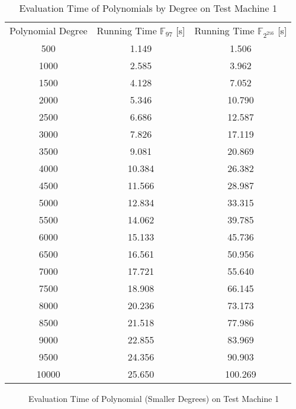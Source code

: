 \begin{table}[ht]
  \centering
  \begin{tabular}{|c|c|c|}
    Polynomial Degree & Running Time $\mathbb{F}_{97}$ [s] & Running Time
    $\mathbb{F}_{2^{256}}$ [s]\\
    500 &  1.149  &   1.506 \\
    1000 &  2.585 &   3.962 \\
    1500 &  4.128 &   7.052 \\
    2000 &  5.346 &  10.790 \\
    2500 &  6.686 &  12.587 \\
    3000 &  7.826 &  17.119 \\
    3500 &  9.081 &  20.869 \\
    4000 & 10.384 &  26.382 \\
    4500 & 11.566 &  28.987 \\
    5000 & 12.834 &  33.315 \\
    5500 & 14.062 &  39.785 \\
    6000 & 15.133 &  45.736 \\
    6500 & 16.561 &  50.956 \\
    7000 & 17.721 &  55.640 \\
    7500 & 18.908 &  66.145 \\
    8000 & 20.236 &  73.173 \\
    8500 & 21.518 &  77.986 \\
    9000 & 22.855 &  83.969 \\
    9500 & 24.356 &  90.903 \\
    10000 & 25.650 & 100.269 \\
  \end{tabular}
  \caption{Evaluation Time of Polynomials by Degree on Test Machine 1}
  \label{tab:poly-deg-t}
\end{table}

\begin{figure}[ht]
  \centering
  
  \caption{Evaluation Time of Polynomial (Smaller Degrees) on Test Machine 1}
  \label{fig:poly-deg-t-small}
\end{figure}


